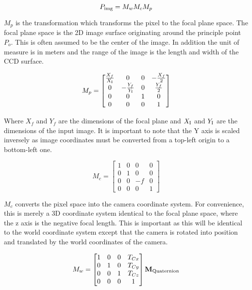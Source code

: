 \begin{equation}
P_{\textup{img}} =  M_{w} M_{c} M_{p}
\end{equation}

 $M_{p}$ is the transformation which transforms the pixel to the focal plane space. The focal plane space is the
2D image surface originating around the principle point $P_o$.  This is often assumed to be the center of the image.
In addition the unit of measure is in meters and the range of the image is the length and width of the CCD surface.

\begin{equation}
M_{p} = 
\begin{bmatrix}
 \frac{X_{f}}{X_{\textup{I}}}& 0 & 0 & -\frac{X_f}{2} \\ 
0 & -\frac{Y_{f}}{Y_{\textup{I}}} & 0 & \frac{Y_f}{2} \\ 
0 & 0 & 1 &0 \\ 
0 & 0 & 0 &1 
\end{bmatrix}
\end{equation}



Where $X_{f}$ and $Y_{f}$ are the dimensions of the focal plane and $X_{\textup{I}}$ and $Y_{\textup{I}}$
are the dimensions of the input image.  It is important to note that the Y axis is scaled inversely
as image coordinates must be converted from a top-left origin to a bottom-left one.

\begin{equation}
M_{c} = 
\begin{bmatrix}
1 & 0 & 0 & 0\\ 
0 & 1 & 0 & 0\\ 
0 & 0 & -f & 0\\ 
0 & 0 & 0 & 1
\end{bmatrix}
\end{equation}


$M_{c}$ converts the pixel space into the camera coordinate system. For convenience, this is merely a 3D 
coordinate system identical to the focal plane space, where the z axis is the negative focal length.  This
is important as this will be identical to the world coordinate system except that the camera is rotated
into position and translated by the world coordinates of the camera. 

\begin{equation}
M_{w} = \begin{bmatrix}
1 & 0 & 0 & T_{Cx}\\ 
0 & 1 & 0 & T_{Cy}\\ 
0 & 0 & 1 & T_{Cz}\\ 
0 & 0 & 0 & 1
\end{bmatrix} 
\mathbf{M_{\textup{Quaternion}}}
\end{equation}

